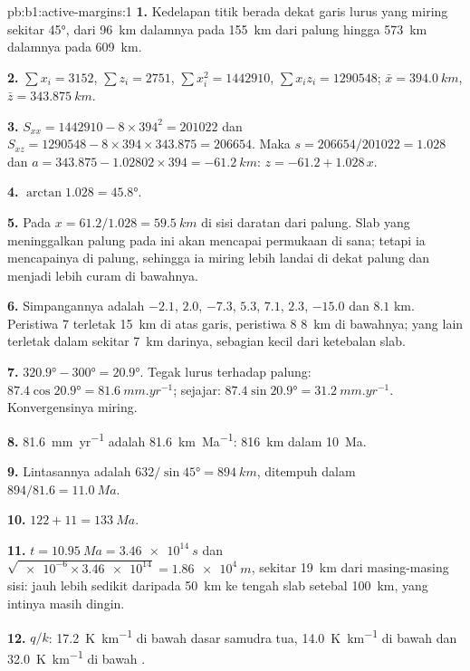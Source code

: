 \begin{solution}{pb:b1:active-margins:1}
\textbf{1.} Kedelapan titik berada dekat garis lurus yang miring sekitar
\ang{45}, dari \qty{96}{km} dalamnya pada \qty{155}{km} dari palung hingga
\qty{573}{km} dalamnya pada \qty{609}{km}.

\textbf{2.} $\sum x_i = 3152$, $\sum z_i = 2751$, $\sum x_i^2 = \num{1442910}$,
$\sum x_i z_i = \num{1290548}$; $\bar x = \qty{394.0}{km}$,
$\bar z = \qty{343.875}{km}$.

\textbf{3.} $S_{xx} = 1442910 - 8\times394^2 = \num{201022}$ dan
$S_{xz} = 1290548 - 8\times394\times343.875 = \num{206654}$. Maka
$s = 206654/201022 = 1.028$ dan $a = 343.875 - 1.02802\times394 =
\qty{-61.2}{km}$: $z = -61.2 + 1.028\,x$.

\textbf{4.} $\arctan1.028 = \ang{45.8}$.

\textbf{5.} Pada $x = 61.2/1.028 = \qty{59.5}{km}$ di sisi daratan dari palung. Slab
yang meninggalkan palung pada  ini akan mencapai permukaan di sana; tetapi ia
mencapainya di palung, sehingga ia miring lebih landai di dekat palung dan menjadi lebih
curam di bawahnya.

\textbf{6.} Simpangannya adalah $-2.1$, $2.0$, $-7.3$, $5.3$, $7.1$, $2.3$,
$-15.0$ dan $8.1$ \unit{km}. Peristiwa 7 terletak \qty{15}{km} di atas garis,
peristiwa 8 \qty{8}{km} di bawahnya; yang lain terletak dalam sekitar \qty{7}{km} darinya,
sebagian kecil dari ketebalan slab.

\textbf{7.} $\ang{320.9} - \ang{300} = \ang{20.9}$. Tegak lurus terhadap palung:
$87.4\cos\ang{20.9} = \qty{81.6}{mm.yr^{-1}}$; sejajar:
$87.4\sin\ang{20.9} = \qty{31.2}{mm.yr^{-1}}$. Konvergensinya miring.

\textbf{8.} \qty{81.6}{mm.yr^{-1}} adalah \qty{81.6}{km.Ma^{-1}}: \qty{816}{km} dalam
\qty{10}{Ma}.

\textbf{9.} Lintasannya adalah $632/\sin\ang{45} = \qty{894}{km}$, ditempuh dalam
$894/81.6 = \qty{11.0}{Ma}$.

\textbf{10.} $122 + 11 = \qty{133}{Ma}$.

\textbf{11.} $t = \qty{10.95}{Ma} = \qty{3.46e14}{s}$ dan
$\sqrt{\num{e-6}\times\num{3.46e14}} = \qty{1.86e4}{m}$, sekitar \qty{19}{km}
dari masing-masing sisi: jauh lebih sedikit daripada \qty{50}{km} ke tengah slab
setebal \qty{100}{km}, yang intinya masih dingin.

\textbf{12.} $q/k$: \qty{17.2}{K.km^{-1}} di bawah dasar samudra tua,
\qty{14.0}{K.km^{-1}} di bawah  dan \qty{32.0}{K.km^{-1}} di bawah
.


\end{solution}
